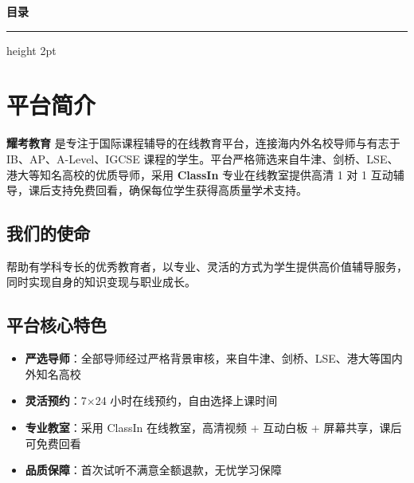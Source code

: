 \documentclass[a4paper,10pt]{article}
\begin{document}
\vfill

\newpage

\thispagestyle{fancy}

{\color{BrandBlue}\Large\bfseries 目\quad 录}
\vspace{6pt}
{\color{GrayBorder}\hrule height 2pt}
\vspace{4pt}

\tableofcontents

\newpage


\section{平台简介}

\begin{goldbox}
\textbf{耀考教育} 是专注于国际课程辅导的在线教育平台，连接海内外名校导师与有志于 IB、AP、A-Level、IGCSE 课程的学生。平台严格筛选来自牛津、剑桥、LSE、港大等知名高校的优质导师，采用 \textbf{ClassIn} 专业在线教室提供高清 1 对 1 互动辅导，课后支持免费回看，确保每位学生获得高质量学术支持。
\end{goldbox}

\subsection{我们的使命}

帮助有学科专长的优秀教育者，以专业、灵活的方式为学生提供高价值辅导服务，同时实现自身的知识变现与职业成长。

\subsection{平台核心特色}

\begin{itemize}
  \item \textbf{严选导师}：全部导师经过严格背景审核，来自牛津、剑桥、LSE、港大等国内外知名高校
  \item \textbf{灵活预约}：7$\times$24 小时在线预约，自由选择上课时间
  \item \textbf{专业教室}：采用 ClassIn 在线教室，高清视频 + 互动白板 + 屏幕共享，课后可免费回看
  \item \textbf{品质保障}：首次试听不满意全额退款，无忧学习保障
\end{itemize}
\end{document}
